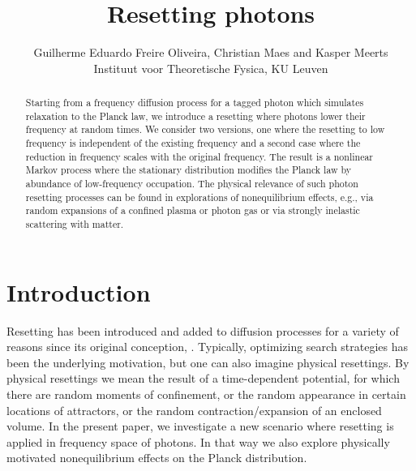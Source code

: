 \documentclass[a4paper,12pt,reqno,superscriptaddress,nofootinbib]{article}
\theoremstyle{plain}
\theoremstyle{definition}
\theoremstyle{remark}
\newcommand{\0}{^{(0)}}
\newcommand{\1}{^{(1)}}
\newcommand{\2}{^{(2)}}
\begin{document}
	\title{Resetting photons}	
	\author{Guilherme Eduardo Freire Oliveira, Christian Maes and Kasper Meerts\\ Instituut voor Theoretische Fysica, KU Leuven}

\begin{abstract}
Starting from a frequency diffusion process for a tagged photon which simulates relaxation to the Planck law, we introduce a resetting where photons lower their frequency at random times.
We consider two versions, one where the resetting to low frequency is independent of the existing frequency and a second case where the reduction in frequency scales with the original frequency.  The result is a nonlinear Markov process where the stationary distribution modifies the Planck law by abundance of low-frequency occupation. The physical relevance of such photon resetting processes can be found in explorations of nonequilibrium effects, e.g., via random expansions of a confined plasma or photon gas or via strongly inelastic scattering with matter.
\end{abstract}
\maketitle

\tableofcontents
\section{Introduction}
Resetting has been introduced and added to diffusion processes for a variety of reasons since its original conception, \cite{evans}.  Typically, optimizing search strategies has been the underlying motivation, but one can also imagine physical resettings.  By physical resettings we mean the result of a time-dependent potential, for which there are random moments of confinement, or the random appearance in certain locations of attractors, or the random contraction/expansion of an enclosed volume.  In the present paper, we investigate a new scenario where resetting is applied in frequency space of photons.  In that way we also explore physically motivated nonequilibrium effects on the Planck distribution.\\
\end{document}
